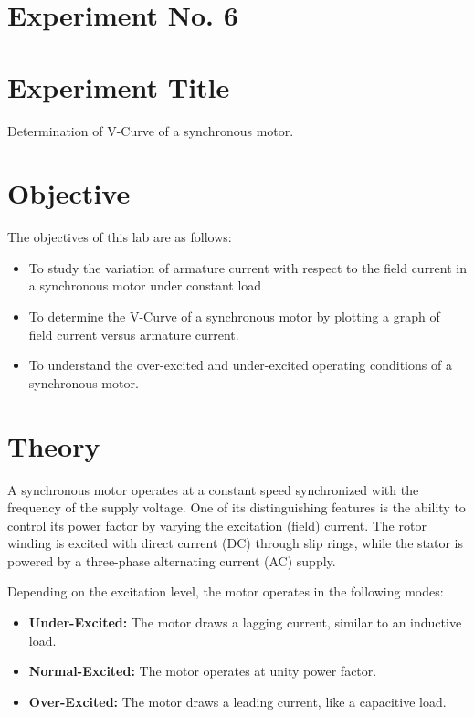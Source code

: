 \documentclass[a4paper,12pt]{article}
\begin{document}
	\section{Experiment No. 6}
	
	\section{Experiment Title }
	Determination of V-Curve of a synchronous motor.
	
	\section{Objective}
	
	The objectives of this lab are as follows:
	\begin{itemize}
		\item 	To study the variation of armature current with respect to the field current in a synchronous motor under constant load
		\item 	To determine the V-Curve of a synchronous motor by plotting a graph of field current versus armature current.
		
		\item 	To understand the over-excited and under-excited operating conditions of a synchronous motor.
		
		
	\end{itemize}
	
	\section{Theory}
	
	A synchronous motor operates at a constant speed synchronized with the frequency of the supply voltage. One of its distinguishing features is the ability to control its power factor by varying the excitation (field) current. The rotor winding is excited with direct current (DC) through slip rings, while the stator is powered by a three-phase alternating current (AC) supply.
	
	Depending on the excitation level, the motor operates in the following modes:
	\begin{itemize}
		\item \textbf{Under-Excited:} The motor draws a lagging current, similar to an inductive load.
		\item \textbf{Normal-Excited:} The motor operates at unity power factor.
		\item \textbf{Over-Excited:} The motor draws a leading current, like a capacitive load.
	\end{itemize}
	
\end{document}
